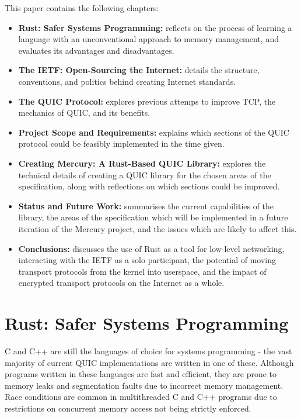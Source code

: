 \documentclass{l4proj}
\begin{document}
This paper contains the following chapters:
\begin{itemize}
\item{\textbf{Rust: Safer Systems Programming:} reflects on the process of learning a language with an unconventional approach to memory management, and evaluates its advantages and disadvantages.}
\item{\textbf{The IETF: Open-Sourcing the Internet:} details the structure, conventions, and politics behind creating Internet standards.}
\item{\textbf{The QUIC Protocol:} explores previous attemps to improve TCP, the mechanics of QUIC, and its benefits.}
\item{\textbf{Project Scope and Requirements:} explains which sections of the QUIC protocol could be feasibly implemented in the time given.}
\item{\textbf{Creating Mercury: A Rust-Based QUIC Library:} explores the technical details of creating a QUIC library for the chosen areas of the specification, along with reflections on which sections could be improved.}
\item{\textbf{Status and Future Work:} summarises the current capabilities of the library, the areas of the specification which will be implemented in a future iteration of the Mercury project, and the issues which are likely to affect this.}
\item{\textbf{Conclusions:} discusses the use of Rust as a tool for low-level networking, interacting with the IETF as a solo participant, the potential of moving transport protocols from the kernel into userspace, and the impact of encrypted transport protocols on the Internet as a whole.}
\end{itemize}


\pagebreak


\chapter{Rust: Safer Systems Programming}
C and C++ are still the languages of choice for systems programming - the vast majority of current QUIC implementations are written in one of these.\cite{quic-implementations} Although programs written in these languages are fast and efficient, they are prone to memory leaks and segmentation faults due to incorrect memory management. Race conditions are common in multithreaded C and C++ programs due to restrictions on concurrent memory access not being strictly enforced.
\end{document}
